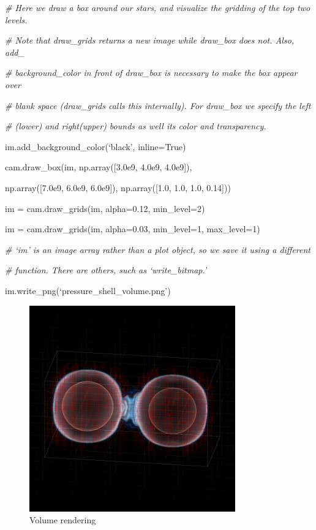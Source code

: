 {\it\# Here we draw a box around our stars, and visualize the gridding of the top two levels.}
{\setlength{\parskip}{0pt}

{\it\# Note that draw\_grids returns a new image while draw\_box does not. Also, add\_}

{\it\# background\_color in front of draw\_box is necessary to make the box appear over}

{\it\# blank space (draw\_grids calls this internally). For draw\_box we specify the left}

{\it\# (lower) and right(upper) bounds as well its color and transparency.}

im.add\_background\_color(`black', inline=True)
}

cam.draw\_box(im, np.array([3.0e9, 4.0e9, 4.0e9]),

{\setlength{\parindent}{72pt}np.array([7.0e9, 6.0e9, 6.0e9]), np.array([1.0, 1.0, 1.0, 0.14]))}

im = cam.draw\_grids(im, alpha=0.12, min\_level=2)

im = cam.draw\_grids(im, alpha=0.03, min\_level=1, max\_level=1)

{\it\# `im' is an image array rather than a plot object, so we save it using a different}
{\setlength{\parskip}{0pt}

{\it\# function. There are others, such as `write\_bitmap.'}

im.write\_png(`pressure\_shell\_volume.png')
}
\begin{figure}[h]
\centering
\includegraphics[width=3.5in]{volume}
\caption{Volume rendering}
\end{figure}



